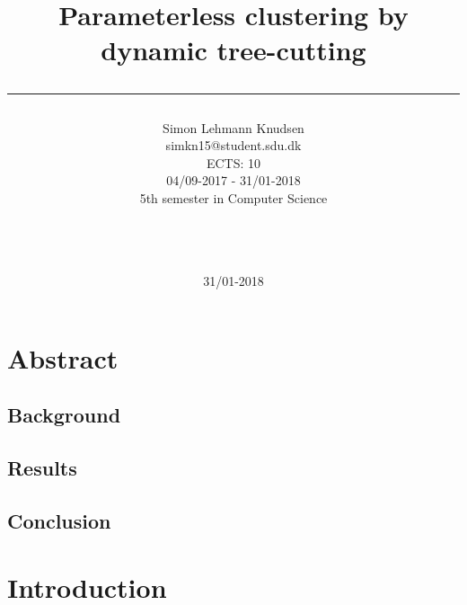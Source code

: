 \documentclass[a4paper,10pt]{article}
\title{ Parameterless clustering by dynamic tree-cutting \rule{10cm}{0.5mm}}
\author{Simon Lehmann Knudsen \\
	simkn15@student.sdu.dk \\
	ECTS: 10 \\
	04/09-2017 - 31/01-2018 \\
	5th semester in Computer Science
\\\rule{5.5cm}{0.5mm}\\}
\date{31/01-2018}
\theoremstyle{plain}
\theoremstyle{definition}
\begin{document}
\maketitle

\newpage
\tableofcontents

\newpage
\section{Abstract}

\subsection{Background}

\subsection{Results}

\subsection{Conclusion}

\newpage
\section{Introduction}
\end{document}
